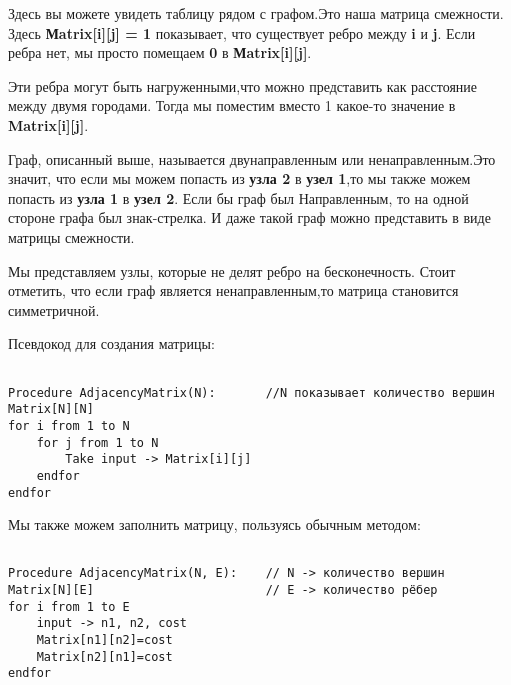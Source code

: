 Здесь вы можете увидеть таблицу рядом с графом.Это наша матрица
смежности. Здесь \textbf{Мatrix[i][j] = 1} показывает, что существует ребро между \textbf{i} и \textbf{j}. Если ребра нет, мы просто помещаем \textbf{0} в \textbf{Мatrix[i][j]}.

\vspace{\baselineskip}
Эти ребра могут быть нагруженными,что можно представить как расстояние между двумя городами. Тогда мы поместим вместо 1 какое-то значение в \textbf{Matrix[i][j]}.

\vspace{\baselineskip}
Граф, описанный выше, называется двунаправленным или ненаправленным.Это значит, что если мы можем попасть из \textbf{узла 2} в \textbf{узел 1},то  мы также можем попасть из \textbf{узла 1} в \textbf{узел 2}. Если бы  граф был Направленным, то на одной стороне графа был знак-стрелка. И даже такой граф можно представить в виде матрицы смежности.


Мы представляем узлы, которые не делят ребро на бесконечность. Стоит отметить, что если граф является ненаправленным,то матрица становится симметричной.

\vspace{\baselineskip}
Псевдокод для создания матрицы:

\vspace{\baselineskip}
\begin{tcolorbox}
\begin{verbatim}

Procedure AdjacencyMatrix(N):		//N показывает количество вершин
Matrix[N][N]
for i from 1 to N		   
	for j from 1 to N
		Take input -> Matrix[i][j]
	endfor
endfor

\end{verbatim}
\end{tcolorbox}

\vspace{\baselineskip}
Мы также можем заполнить матрицу, пользуясь обычным методом:

\vspace{\baselineskip}
\begin{tcolorbox}
\begin{verbatim}

Procedure AdjacencyMatrix(N, E):	// N -> количество вершин
Matrix[N][E]	   					// E -> количество рёбер
for i from 1 to E
	input -> n1, n2, cost
	Matrix[n1][n2]=cost
	Matrix[n2][n1]=cost
endfor

\end{verbatim}
\end{tcolorbox}

